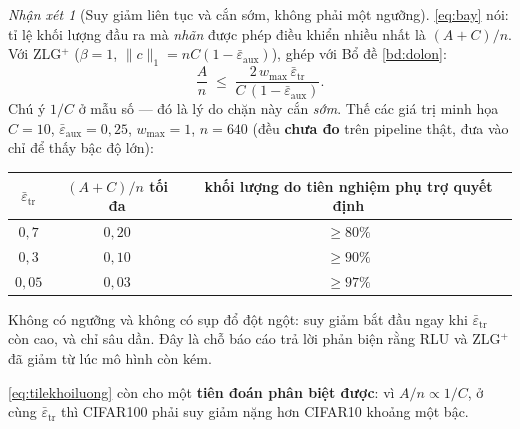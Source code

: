 \documentclass[11pt,a4paper]{article}
\theoremstyle{remark}
\newtheorem{nhanxet}[dinhly]{Nhận xét}
\newcommand{\epstr}{\bar\varepsilon_{\mathrm{tr}}}
\newcommand{\epsaux}{\bar\varepsilon_{\mathrm{aux}}}
\begin{document}
\begin{nhanxet}[Suy giảm liên tục và cắn sớm, không phải một ngưỡng]
\label{nx:lientuc}
\eqref{eq:bay} nói: tỉ lệ khối lượng đầu ra mà \emph{nhãn} được phép điều
khiển nhiều nhất là $(A+C)/n$. Với ZLG$^+$ ($\beta=1$,
$\|c\|_1=nC(1-\epsaux)$), ghép với Bổ đề \ref{bd:dolon}:
\begin{equation}
\frac{A}{n}\;\le\;\frac{2\,w_{\max}\,\epstr}{C\,(1-\epsaux)} .
\label{eq:tilekhoiluong}
\end{equation}
Chú ý $1/C$ ở mẫu số --- đó là lý do chặn này cắn \emph{sớm}. Thế các giá trị
minh họa $C=10$, $\epsaux=0{,}25$, $w_{\max}=1$, $n=640$ (đều \textbf{chưa
đo} trên pipeline thật, đưa vào chỉ để thấy bậc độ lớn):

\begin{center}
\begin{tabular}{@{}ccc@{}}
\toprule
$\epstr$ & $(A+C)/n$ tối đa & khối lượng do tiên nghiệm phụ trợ quyết định \\
\midrule
$0{,}7$  & $0{,}20$ & $\ge 80\%$ \\
$0{,}3$  & $0{,}10$ & $\ge 90\%$ \\
$0{,}05$ & $0{,}03$ & $\ge 97\%$ \\
\bottomrule
\end{tabular}
\end{center}

Không có ngưỡng và không có sụp đổ đột ngột: suy giảm bắt đầu ngay khi
$\epstr$ còn cao, và chỉ sâu dần. Đây là chỗ báo cáo trả lời phản biện rằng
RLU và ZLG$^+$ đã giảm từ lúc mô hình còn kém.

\eqref{eq:tilekhoiluong} còn cho một \textbf{tiên đoán phân biệt được}: vì
$A/n\propto1/C$, ở cùng $\epstr$ thì CIFAR100 phải suy giảm nặng hơn CIFAR10
khoảng một bậc.
\end{nhanxet}
\end{document}
